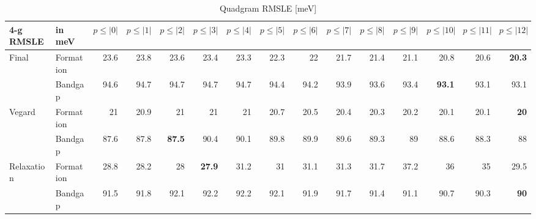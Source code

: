 \documentclass[11pt,oneside,czech,american]{book} %
\theoremstyle{definition} %
\theoremstyle{definition}
\begin{document}
\begin{table}[H]
	\scriptsize
	\centering
\begin{tabular}{llrrrrrrrrrrrrr}
	\hline
	4-g RMSLE   & in meV    &   $p{\leq}|0|$ &   $p{\leq}|1|$ &   $p{\leq}|2|$ &   $p{\leq}|3|$ &   $p{\leq}|4|$ &   $p{\leq}|5|$ &   $p{\leq}|6|$ &   $p{\leq}|7|$ &   $p{\leq}|8|$ &   $p{\leq}|9|$ &   $p{\leq}|10|$ &   $p{\leq}|11|$ &   $p{\leq}|12|$ \\
	\hline
	\multirow{2}{*}{Final}       & Formation &       23.6 &       23.8 &       23.6 &       23.4 &       23.3 &       22.3 &       22   &       21.7 &       21.4 &       21.1 &        20.8 &        20.6 &        \textbf{20.3} \\
	       & Bandgap   &       94.6 &       94.7 &       94.7 &       94.7 &       94.7 &       94.4 &       94.2 &       93.9 &       93.6 &       93.4 &        \textbf{93.1} &        93.1 &        93.1 \\
	\multirow{2}{*}{Vegard}      & Formation &       21   &       20.9 &       21   &       21   &       21   &       20.7 &       20.5 &       20.4 &       20.3 &       20.2 &        20.1 &        20.1 &        \textbf{20}   \\
	      & Bandgap   &       87.6 &       87.8 &       \textbf{87.5} &       90.4 &       90.1 &       89.8 &       89.9 &       89.6 &       89.3 &       89   &        88.6 &        88.3 &        88   \\
	\multirow{2}{*}{Relaxation}  & Formation &       28.8 &       28.2 &       28   &       \textbf{27.9} &       31.2 &       31   &       31.1 &       31.3 &       31.7 &       37.2 &        36   &        35   &        29.5 \\
	  & Bandgap   &       91.5 &       91.8 &       92.1 &       92.2 &       92.2 &       92.1 &       91.9 &       91.7 &       91.4 &       91.1 &        90.7 &        90.3 &        \textbf{90}   \\
	\hline
\end{tabular}
	\caption{Quadgram RMSLE [meV]}
	\label{4-g RMSLE hat}
\end{table}
\newpage
\end{document}
